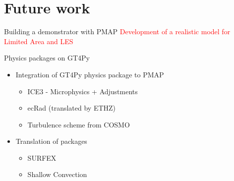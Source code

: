\documentclass{beamer}
\begin{document}
\section{Future work}
\begin{frame}{Building a demonstrator with PMAP}
    \textcolor{red}{Development of a realistic model for Limited Area and LES}

    \begin{block}{Physics packages on GT4Py}
        \begin{itemize}
            \item Integration of GT4Py physics package to PMAP
            \begin{itemize}
                \item[\faCloudShowersHeavy] \small ICE3 - Microphysics + Adjustments
                \item[\faIcon{radiation}] ecRad (translated by ETHZ)
                \item[\faWind] Turbulence scheme from COSMO
            \end{itemize}
            \item Translation of packages 
            \begin{itemize}
                \item \small SURFEX
                \item Shallow Convection
            \end{itemize}
        \end{itemize}
    \end{block}


\end{frame}
\end{document}
